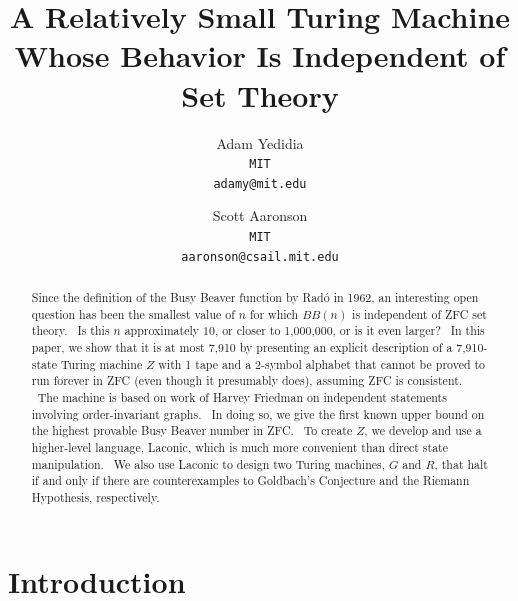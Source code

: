 \documentclass[11pt]{article}
\newcommand{\statenumstate}{7,910-state }
\newcommand{\statenum}{7,910 }
\begin{document}
\title{A Relatively Small Turing Machine Whose Behavior Is Independent of Set Theory}
\author{
    Adam Yedidia\\
    \small\texttt{MIT}\\
    \small\texttt{adamy@mit.edu}
    \and
    Scott Aaronson\\
    \small\texttt{MIT}\\
    \small\texttt{aaronson@csail.mit.edu}
}
\maketitle

\begin{abstract}

Since the definition of the Busy Beaver function by Rad\'{o} in 1962, an interesting open question has been the smallest value of $n$ for which $BB(n)$ is independent of ZFC set theory. \ Is this $n$ approximately $10$, or closer to 1,000,000, or is it even larger? \ In this paper, we show that it is at most \statenum by presenting an explicit description of a \statenumstate Turing machine $Z$ with 1 tape and a 2-symbol alphabet that cannot be proved to run forever in ZFC (even though it presumably does), assuming ZFC is consistent. \ The machine is based on work of Harvey Friedman on independent statements involving order-invariant graphs. \ In doing so, we give the first known upper bound on the highest provable Busy Beaver number in ZFC. \ To create $Z$, we develop and use a higher-level language, Laconic, which is much more convenient than direct state manipulation. \ We also use Laconic to design two Turing machines, $G$ and $R$, that halt if and only if there are counterexamples to Goldbach's Conjecture and the Riemann Hypothesis, respectively.

\end{abstract}

\section{Introduction}

\end{document}
